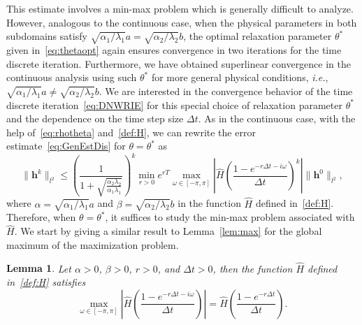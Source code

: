 \documentclass[reqno]{amsart}
\newtheorem{lemma}{Lemma}
\begin{document}
This estimate involves a min-max problem which is generally difficult to analyze. However, analogous to the continuous case, when the physical parameters in both subdomains satisfy $\sqrt{\alpha_1/\lambda_1}a = \sqrt{\alpha_2/\lambda_2}b$, the optimal relaxation parameter $\theta^*$ given in~\eqref{eq:thetaopt} again ensures convergence in two iterations for the time discrete iteration. Furthermore, we have obtained superlinear convergence in the continuous analysis using such $\theta^*$ for more general physical conditions, {\it i.e.}, $\sqrt{\alpha_1/\lambda_1}a \neq \sqrt{\alpha_2/\lambda_2}b$. We are interested in the convergence behavior of the time discrete iteration~\eqref{eq:DNWRIE} for this special choice of relaxation parameter $\theta^*$ and the dependence on the time step size $\Delta t$.
As in the continuous case, with the help of~\eqref{eq:rhotheta} and~\eqref{def:H}, we can rewrite the error estimate~\eqref{eq:GenEstDis} for $\theta=\theta^*$ as
\begin{equation}\label{eq:SpeEstDis}
\|\boldsymbol{h}^k\|_{l^2} \leq \left(\frac{1}{1+\sqrt{\frac{\alpha_2\lambda_2}{\alpha_1\lambda_1}}}\right)^k \min_{r > 0} e^{rT}\max_{\omega \in [-\pi,\pi]} \left|\hat H\left(\frac{1-e^{-r \Delta t -i \omega}}{\Delta t}\right)^k\right| \|\boldsymbol{h}^0\|_{l^2},
\end{equation} 
where $\alpha = \sqrt{\alpha_1/\lambda_1} a$ and $\beta = \sqrt{\alpha_2/\lambda_2} b$ in the function $\hat H$ defined in~\eqref{def:H}. Therefore, when $\theta=\theta^*$, it suffices to study the min-max problem associated with $\hat H$. We start by giving a similar result to Lemma~\ref{lem:max} for the global maximum of the maximization problem. 

\begin{lemma}\label{lem:maxDisc}
Let $\alpha> 0$, $\beta>0$, $r>0$, and $\Delta t>0$, then the function $\hat{H}$ defined in~\eqref{def:H} satisfies 
\[\max_{\omega \in [-\pi,\pi]} \left| \hat{H} \left(\frac{1-e^{-r \Delta t - i \omega}}{\Delta t}\right) \right| 
= \hat{H} \left(\frac{1-e^{-r \Delta t}}{\Delta t}\right).\]
\end{lemma}
\end{document}
